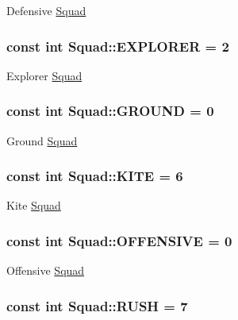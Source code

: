 Defensive \hyperlink{class_squad}{Squad} \hypertarget{class_squad_a0840d63949a8301743d9b21cbb99abc7}{
\subsubsection[{E\-X\-P\-L\-O\-R\-E\-R}]{\setlength{\rightskip}{0pt plus 5cm}const int Squad\-::\-E\-X\-P\-L\-O\-R\-E\-R = 2\hspace{0.3cm}{\ttfamily [static]}}}\label{class_squad_a0840d63949a8301743d9b21cbb99abc7}
Explorer \hyperlink{class_squad}{Squad} \hypertarget{class_squad_a01e00ec7576957ee38d4b5af61144ef6}{
\subsubsection[{G\-R\-O\-U\-N\-D}]{\setlength{\rightskip}{0pt plus 5cm}const int Squad\-::\-G\-R\-O\-U\-N\-D = 0\hspace{0.3cm}{\ttfamily [static]}}}\label{class_squad_a01e00ec7576957ee38d4b5af61144ef6}
Ground \hyperlink{class_squad}{Squad} \hypertarget{class_squad_af6cce24e22d96f4aa9d59e71083b7ace}{
\subsubsection[{K\-I\-T\-E}]{\setlength{\rightskip}{0pt plus 5cm}const int Squad\-::\-K\-I\-T\-E = 6\hspace{0.3cm}{\ttfamily [static]}}}\label{class_squad_af6cce24e22d96f4aa9d59e71083b7ace}
Kite \hyperlink{class_squad}{Squad} \hypertarget{class_squad_ac629d438d6297bb1fe40f33e90741553}{
\subsubsection[{O\-F\-F\-E\-N\-S\-I\-V\-E}]{\setlength{\rightskip}{0pt plus 5cm}const int Squad\-::\-O\-F\-F\-E\-N\-S\-I\-V\-E = 0\hspace{0.3cm}{\ttfamily [static]}}}\label{class_squad_ac629d438d6297bb1fe40f33e90741553}
Offensive \hyperlink{class_squad}{Squad} \hypertarget{class_squad_a866b266f0f5b4fb8099d7ea83b2163b3}{
\subsubsection[{R\-U\-S\-H}]{\setlength{\rightskip}{0pt plus 5cm}const int Squad\-::\-R\-U\-S\-H = 7\hspace{0.3cm}{\ttfamily [static]}}}\label{class_squad_a866b266f0f5b4fb8099d7ea83b2163b3}
